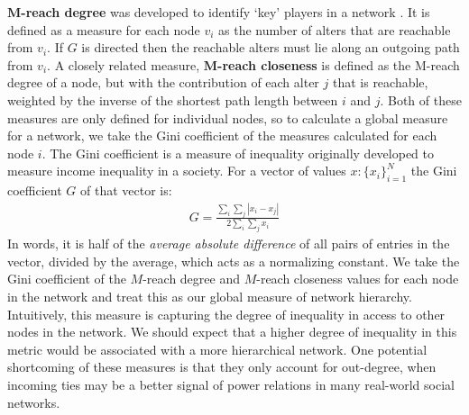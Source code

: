 \documentclass[3p,times]{elsarticle}
\begin{document}
\textbf{$\mathbf{M}$-reach degree} was developed to identify `key' players in a network \cite{key}.  It is defined as a measure for each node $v_{i}$ as the number of alters that are reachable from $v_{i}.$ If $G$ is directed then the reachable alters must lie along an outgoing path from $v_{i}$. A closely related measure, \textbf{$\mathbf{M}$-reach closeness} is defined as the M-reach degree of a node, but with the contribution of each alter $j$ that is reachable, weighted by the inverse of the shortest path length between $i$ and $j$. Both of these measures are only defined for individual nodes, so to calculate a global measure for a network, we take the Gini coefficient of the measures calculated for each node $i$. The Gini  coefficient \cite{Yitzhaki1979} is a measure of inequality originally developed to measure income inequality in a society. For a vector of values $x : \{x_i\}_{i=1}^{N}$ the Gini coefficient $G$ of that vector is:
\begin{align}
	G = \frac{\displaystyle{\sum_i \sum_j \left| x_i - x_j \right|}}{\displaystyle{2 \sum_i \sum_j x_i}}
\end{align}
In words, it is half of the \emph{average absolute difference} of all pairs of entries in the vector, divided by the average, which acts as a normalizing constant. We take the Gini coefficient of the $M$-reach degree and $M$-reach closeness values for each node in the network and treat this as our global measure of network hierarchy. Intuitively, this measure is capturing the degree of inequality in access to other nodes in the network. We should expect that a higher degree of inequality in this metric would be associated with a more hierarchical network. One potential shortcoming of these measures is that they only account for out-degree, when incoming ties may be a better signal of power relations in many real-world social networks.
\end{document}
